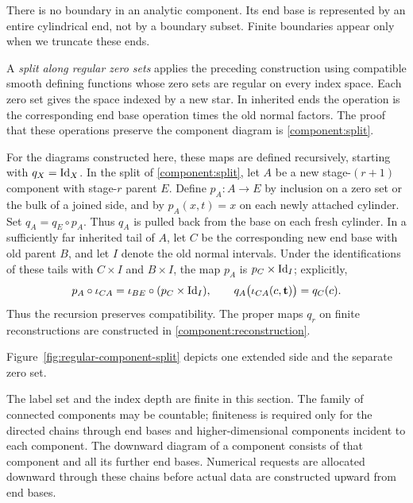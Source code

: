 There is no boundary in an analytic component.  Its end base is represented by
an entire cylindrical end, not by a boundary subset.  Finite boundaries
appear only when we truncate these ends.

A \emph{split along regular zero sets} applies the preceding construction using
compatible smooth defining functions whose zero sets are regular on
every index space. Each zero set gives the space indexed by a new star.
In inherited ends the operation is the corresponding end base operation
times the old normal factors. The proof that these operations preserve
the component diagram is \cref{component:split}.

For the diagrams constructed here, these maps are defined recursively,
starting with $q_X=\operatorname{Id}_X$.  In the split of \cref{component:split}, let
$A$ be a new stage-$(r+1)$ component with stage-$r$ parent $E$.
Define $p_A:A\to E$ by inclusion on a zero set or the bulk of a joined
side, and by $p_A(x,t)=x$ on each newly attached cylinder.
Set $q_A=q_E\circ p_A$.  Thus $q_A$ is pulled back from the base on
each fresh cylinder.  In a sufficiently far inherited tail of $A$,
let $C$ be the corresponding new end base with old parent $B$, and let
$I$ denote the old normal intervals.  Under the identifications of
these tails with $C\times I$ and $B\times I$, the map $p_A$ is
$p_C\times\operatorname{Id}_I$; explicitly,
\[
 p_A\circ\iota_{CA}=\iota_{BE}\circ(p_C\times\operatorname{Id}_I),\qquad
 q_A\bigl(\iota_{CA}(c,\mathbf t)\bigr)=q_C(c).
\]
Thus the recursion preserves compatibility.  The proper maps $q_r$
on finite reconstructions are constructed in
\cref{component:reconstruction}.

Figure~\ref{fig:regular-component-split} depicts one extended side and the
separate zero set.


The label set and the index depth are finite in this section. The family
of connected components may be countable; finiteness is required only for
the directed chains through end bases and higher-dimensional components
incident to each component. The
downward diagram of a component consists of that component and all its further
end bases. Numerical
requests are allocated downward through these chains before actual data
are constructed upward from end bases.

